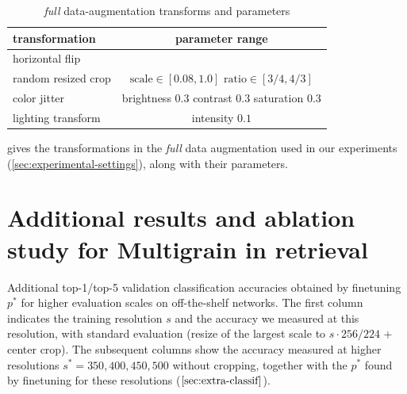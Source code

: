 %
\label{sec:full-data-augment}

\begin{table}
\centering
\caption{\label{tab:full-data-augment}
	\emph{full} data-augmentation transforms and parameters
}
{\small
\begin{tabular}{@{}lc@{}}
\toprule
\textbf{transformation} & \textbf{parameter range} \\ \midrule
horizontal flip           & \\
\midrule
random resized crop       & \makecell{$\text{scale}\in [0.08, 1.0]$ \\ $\text{ratio}\in [3/4, 4/3]$} \\
\midrule
color jitter & \makecell{brightness $0.3$\\contrast $0.3$\\
saturation $0.3$}\\
\midrule
lighting transform & intensity $0.1$ \\
\bottomrule
\end{tabular}
}
\end{table}

 gives the transformations in the \emph{full} data augmentation used in our experiments (\cref{sec:experimental-settings}), along with their parameters. 
%
%
%

\begin{table}[t]
%
\renewcommand\thetable{D.1}
\centering
\caption{\label{tab:instanceres-abl}
	Full results including Copydays + 10k distractors (CD10k, $\%$~mAP), and ablation study for the MultiGrain models. 
	The Pytorch model simply extract the last activation layer as a descriptor~\cite{babenko2014neural}. 
	Resnet-50 corresponds to features extracted from a 
    classification baseline with $p = 1$ or $p = 3$ GeM pooling, trained with cross-entropy with our training schedule, data augmentation, and uniform batch sampling.
}

\end{table}


\section{Additional results and ablation study for Multigrain in retrieval}
\label{sec:ablationretrieval}

\begin{table}[tb]
%
\renewcommand\thetable{E.1}
\centering
\caption{\label{tab:extra-classif}
    Additional top-1/top-5 validation classification accuracies obtained by finetuning $p^*$ for higher evaluation scales on off-the-shelf networks.
    The first column indicates the training resolution $s$ and the accuracy we measured at this resolution, with standard evaluation (resize of the largest scale to $s \cdot 256/224$ + center crop). 
    The subsequent columns show the accuracy measured at higher resolutions $s^*=350,400,450,500$ without cropping, together with the $p^*$ found by finetuning for these resolutions ($\cref{sec:extra-classif}$).
}

\end{table}

